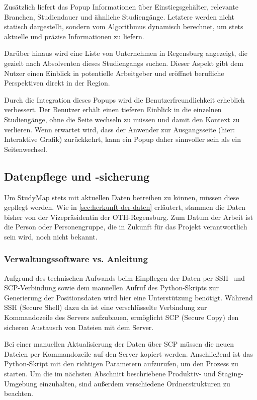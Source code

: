 Zusätzlich liefert das Popup Informationen über Einstiegsgehälter, relevante Branchen, Studiendauer und ähnliche Studiengänge. Letztere werden nicht statisch dargestellt, sondern vom Algorithmus dynamisch berechnet, um stets aktuelle und präzise Informationen zu liefern.

Darüber hinaus wird eine Liste von Unternehmen in Regensburg angezeigt, die gezielt nach Absolventen dieses Studiengangs suchen. Dieser Aspekt gibt dem Nutzer einen Einblick in potentielle Arbeitgeber und eröffnet berufliche Perspektiven direkt in der Region.

Durch die Integration dieses Popups wird die Benutzerfreundlichkeit erheblich verbessert. Der Benutzer erhält einen tieferen Einblick in die einzelnen Studiengänge, ohne die Seite wechseln zu müssen und damit den Kontext zu verlieren. Wenn erwartet wird, dass der Anwender zur Ausgangsseite (hier: Interaktive Grafik) zurückkehrt, kann ein Popup daher sinnvoller sein als ein Seitenwechsel. \parencite{neufeld_modal_2020}

\subsection{Datenpflege und -sicherung}
Um StudyMap stets mit aktuellen Daten betreiben zu können, müssen diese gepflegt werden. Wie in \autoref{sec:herkunft-der-daten} erläutert, stammen die Daten bisher von der Vizepräsidentin der OTH-Regensburg. Zum Datum der Arbeit ist die Person oder Personengruppe, die in Zukunft für das Projekt verantwortlich sein wird, noch nicht bekannt.

\subsubsection{Verwaltungssoftware vs. Anleitung}\label{sec:verwaltungssoftware}
Aufgrund des technischen Aufwands beim Einpflegen der Daten per SSH- und SCP-Verbindung sowie dem manuellen Aufruf des Python-Skripts zur Generierung der Positionsdaten wird hier eine Unterstützung benötigt. Während SSH (Secure Shell) dazu da ist eine verschlüsselte Verbindung zur Kommandozeile des Servers aufzubauen, ermöglicht SCP (Secure Copy) den sicheren Austausch von Dateien mit dem Server.

Bei einer manuellen Aktualisierung der Daten über SCP müssen die neuen Dateien per Kommandozeile auf den Server kopiert werden. Anschließend ist das Python-Skript mit den richtigen Parametern aufzurufen, um den Prozess zu starten. Um die im nächsten Abschnitt beschriebene Produktiv- und Staging-Umgebung einzuhalten, sind außerdem verschiedene Ordnerstrukturen zu beachten.

